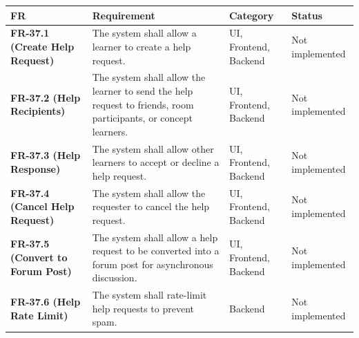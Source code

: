 \documentclass[12pt]{article}
\renewcommand{\baselinestretch}{1.5}
\begin{document}
\begingroup
\small
\renewcommand{\baselinestretch}{1.0}\selectfont
\renewcommand{\arraystretch}{1.15}
\setlength{\tabcolsep}{6pt}
\begin{longtable}{|>{\raggedright\arraybackslash}p{}|>{\raggedright\arraybackslash}p{}|>{\raggedright\arraybackslash}p{}|>{\raggedright\arraybackslash}p{}|}
\hline
\textbf{FR} & \textbf{Requirement} & \textbf{Category} & \textbf{Status} \\ \hline
\endhead
\textbf{FR-37.1 (Create Help Request)} & The system shall allow a learner to create a help request. & UI, Frontend, Backend & Not implemented \\ \hline
\textbf{FR-37.2 (Help Recipients)} & The system shall allow the learner to send the help request to friends, room participants, or concept learners. & UI, Frontend, Backend & Not implemented \\ \hline
\textbf{FR-37.3 (Help Response)} & The system shall allow other learners to accept or decline a help request. & UI, Frontend, Backend & Not implemented \\ \hline
\textbf{FR-37.4 (Cancel Help Request)} & The system shall allow the requester to cancel the help request. & UI, Frontend, Backend & Not implemented \\ \hline
\textbf{FR-37.5 (Convert to Forum Post)} & The system shall allow a help request to be converted into a forum post for asynchronous discussion. & UI, Frontend, Backend & Not implemented \\ \hline
\textbf{FR-37.6 (Help Rate Limit)} & The system shall rate-limit help requests to prevent spam. & Backend & Not implemented \\ \hline
\end{longtable}
\endgroup
\par\medskip

\par\medskip
\hypertarget{sec:ui-prototype-specimens}{}
\end{document}
